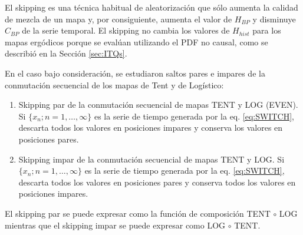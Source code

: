 El skipping es una técnica habitual de aleatorización que sólo aumenta la calidad de mezcla de un mapa y, por consiguiente, aumenta el valor de $H_{BP}$ y disminuye $C_{BP}$ de la serie temporal.
El skipping no cambia los valores de $H_{hist}$ para los mapas ergódicos porque se evalúan utilizando el PDF no causal, como se describió en la Sección \ref{sec:ITQs}.

En el caso bajo consideración, se estudiaron saltos pares e impares de la conmutación secuencial de los mapas de Tent y de Logístico:
\begin{enumerate}
	\item Skipping par de la conmutación secuencial de mapas TENT y LOG (EVEN). \\
	Si $\{x_n; n = 1, \dots, \infty \}$ es la serie de tiempo generada por la eq. \ref{eq:SWITCH}, descarta todos los valores en posiciones impares y conserva los valores en posiciones pares.
	\item Skipping impar de la conmutación secuencial de mapas TENT y LOG.
	Si $\{x_n; n = 1, \dots, \infty \}$ es la serie de tiempo generada por la eq. \ref{eq:SWITCH}, descarta todos los valores en posiciones pares y conserva todos los valores en posiciones impares.
\end{enumerate}
El skipping par se puede expresar como la función de composición TENT $\circ$ LOG mientras que el skipping impar se puede expresar como LOG $\circ$ TENT.